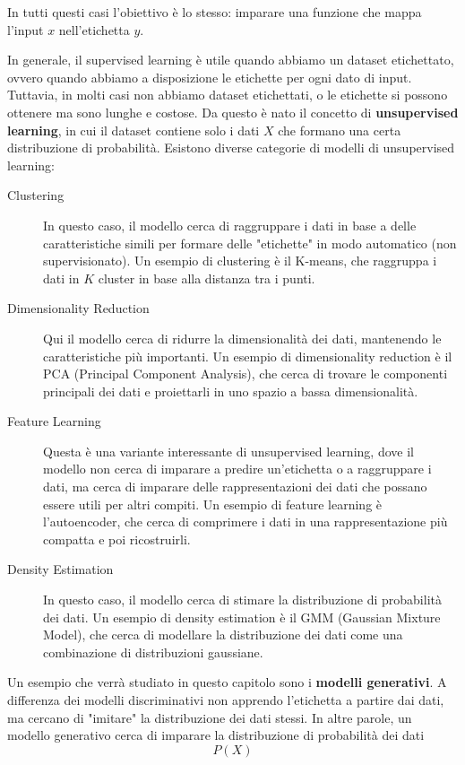 In tutti questi casi l'obiettivo è lo stesso: imparare una funzione che mappa l'input $x$ nell'etichetta $y$.

In generale, il supervised learning è utile quando abbiamo un dataset etichettato, ovvero quando abbiamo a disposizione le etichette per ogni dato di input. Tuttavia, in molti casi non abbiamo dataset etichettati, o le etichette si possono ottenere ma sono lunghe e costose. Da questo è nato il concetto di \textbf{unsupervised learning}, in cui il dataset contiene solo i dati $X$ che formano una certa distribuzione di probabilità. Esistono diverse categorie di modelli di unsupervised learning:
\begin{description}
    \item[Clustering] In questo caso, il modello cerca di raggruppare i dati in base a delle caratteristiche simili per formare delle "etichette" in modo automatico (non supervisionato). Un esempio di clustering è il K-means, che raggruppa i dati in $K$ cluster in base alla distanza tra i punti.
    \item[Dimensionality Reduction] Qui il modello cerca di ridurre la dimensionalità dei dati, mantenendo le caratteristiche più importanti. Un esempio di dimensionality reduction è il PCA (Principal Component Analysis), che cerca di trovare le componenti principali dei dati e proiettarli in uno spazio a bassa dimensionalità.
    \item[Feature Learning] Questa è una variante interessante di unsupervised learning, dove il modello non cerca di imparare a predire un'etichetta o a raggruppare i dati, ma cerca di imparare delle rappresentazioni dei dati che possano essere utili per altri compiti. Un esempio di feature learning è l'autoencoder, che cerca di comprimere i dati in una rappresentazione più compatta e poi ricostruirli.
    \item[Density Estimation] In questo caso, il modello cerca di stimare la distribuzione di probabilità dei dati. Un esempio di density estimation è il GMM (Gaussian Mixture Model), che cerca di modellare la distribuzione dei dati come una combinazione di distribuzioni gaussiane.
\end{description}

Un esempio che verrà studiato in questo capitolo sono i \textbf{modelli generativi}. A differenza dei modelli discriminativi non apprendo l'etichetta a partire dai dati, ma cercano di "imitare" la distribuzione dei dati stessi. In altre parole, un modello generativo cerca di imparare la distribuzione di probabilità dei dati
\[
    P(X)
\]


